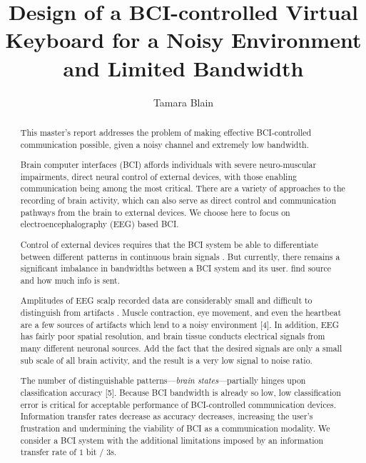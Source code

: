\documentclass[12pt,titlepage]{article}
\begin{document}
\title{Design of a BCI-controlled Virtual Keyboard for a Noisy Environment and Limited Bandwidth} %
\author{Tamara Blain}
\maketitle

\begin{abstract}
This master's report addresses the problem of making effective BCI-controlled communication possible, given a noisy channel and extremely low bandwidth. 

Brain computer interfaces (BCI) affords individuals with severe neuro-muscular impairments, 
direct neural control of external devices, with those enabling communication being among 
the most critical.  There are a variety of approaches to the recording of brain activity, which can also serve as direct control 
and communication pathways from the brain to external devices.  We choose here to focus on electroencephalography (EEG) based BCI.

Control of external devices requires that the BCI system be able to differentiate between 
different patterns in continuous brain signals \cite{lotte_review_2007}.  But currently, there remains a significant 
imbalance in bandwidths between a BCI system and its user.  find source and how much info is sent.

Amplitudes of EEG scalp recorded data are considerably small and difficult to distinguish from 
artifacts \cite{nunez_electric_2005}.  Muscle contraction, eye movement, and even the heartbeat are a few sources of 
artifacts which lend to a noisy environment [4].  In addition, EEG has fairly poor spatial 
resolution, and brain tissue conducts electrical signals from many 
different neuronal sources.  Add the fact that the desired signals are only a small sub scale of all 
brain activity, and the result is a very low signal to noise ratio.

The number of distinguishable patterns---\emph{brain states}---partially hinges upon classification 
accuracy [5].  Because BCI bandwidth is already so low, low classification error is critical for 
acceptable performance of BCI-controlled communication devices.  Information transfer rates 
decrease as accuracy decreases, increasing the user's frustration and  undermining the viability 
of BCI as a communication modality.   We consider a BCI system with the additional 
limitations imposed by an information transfer rate of $1$ bit $/$ $3$s.


\end{abstract}
\end{document}
